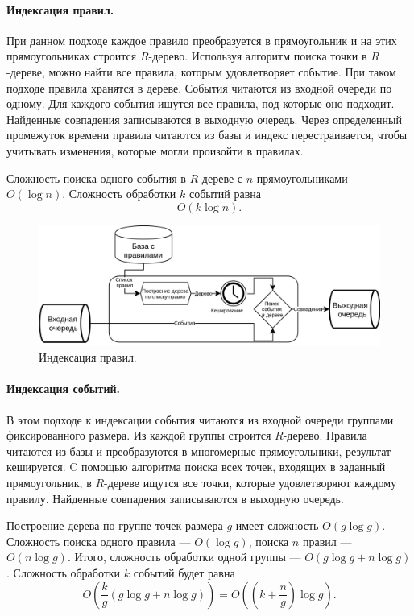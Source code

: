 \documentclass[14pt]{article}
\begin{document}
\paragraph{Индексация правил.} При данном подходе каждое правило преобразуется в прямоугольник и на этих прямоугольниках строится $R$-дерево. Используя алгоритм поиска точки в $R$-дереве, можно найти все правила, которым удовлетворяет событие. При таком подходе правила хранятся в дереве. События читаются из входной очереди по одному. Для каждого события ищутся все правила, под которые оно подходит. Найденные совпадения записываются в выходную очередь. Через определенный промежуток времени правила читаются из базы и индекс перестраивается, чтобы учитывать изменения, которые могли произойти в правилах. 

Сложность поиска одного события в $R$-дереве с $n$ прямоугольниками --- $O(\log n)$. Сложность обработки $k$ событий равна
\[O(k \log n).\]

\begin{figure}[h]
  \centering
    \includegraphics[width=1\textwidth]{images/arch/rulesArch.png}
  \caption{Индексация правил.}
\end{figure}

\paragraph{Индексация событий.} В этом подходе к индексации события читаются из входной очереди группами фиксированного размера. Из каждой группы строится $R$-дерево. Правила читаются из базы и преобразуются в многомерные прямоугольники, результат кешируется. C помощью алгоритма поиска всех точек, входящих в заданный прямоугольник, в $R$-дереве ищутся все точки, которые удовлетворяют каждому правилу. Найденные совпадения записываются в выходную очередь. 

Построение дерева по группе точек размера $g$ имеет сложность $O(g\log g)$. Сложность поиска одного правила --- $O(\log g)$, поиска $n$ правил --- $O(n\log g)$. Итого, сложность обработки одной группы --- $O(g\log g + n\log g)$. Сложность обработки $k$ событий будет равна 
\[ O\left(\frac{k}{g}(g\log g + n\log g)\right) = O\left(\left(k + \frac{n}{g}\right)\log g\right).\]
\end{document}
